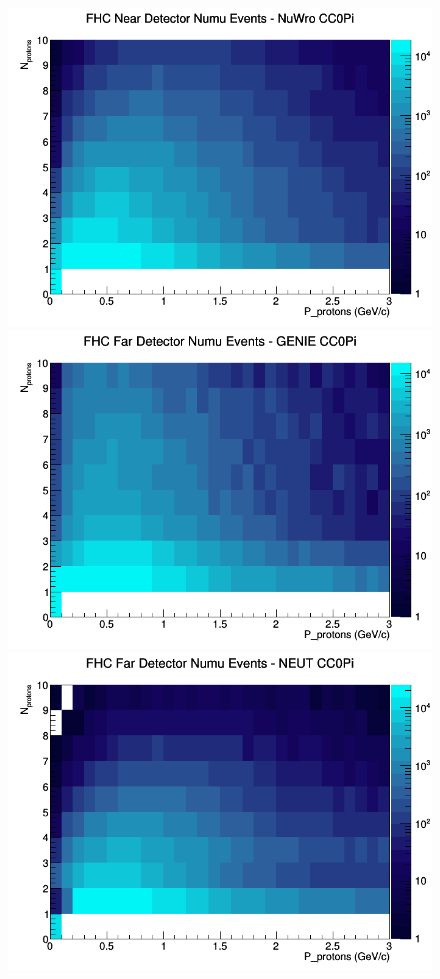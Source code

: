 \begin{figure}[h]
\includegraphics[width=\linewidth]{N_P/nominal/protons/CC0Pi_FHC_ND_numu_N_P_NuWro.png}
\endminipage
\newline
{}
\includegraphics[width=\linewidth]{N_P/nominal/protons/CC0Pi_FHC_FD_numu_N_P_GENIE.png}
\endminipage
{}
\includegraphics[width=\linewidth]{N_P/nominal/protons/CC0Pi_FHC_FD_numu_N_P_NEUT.png}

\end{figure}
